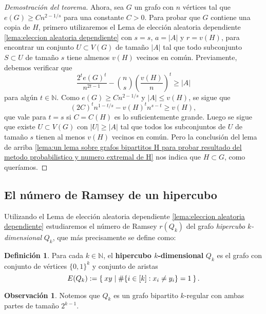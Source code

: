 \documentclass[12pt]{report}
\theoremstyle{plain}
\theoremstyle{definition}
\newtheorem{definition}[theorem]{Definición}
\newtheorem{obs}[theorem]{Observación}
\newcommand{\naturals}{\mathbb{N}}
\newcommand{\abs}[1]{\left \vert #1 \right \vert}
\begin{document}
\begin{proof}[Demostración del teorema]
Ahora, sea $G$ un grafo con $n$ vértices tal que $e(G) \geq C n^{2-1/s}$ para una constante $C >0$. Para probar que $G$ contiene una copia de $H$, primero utilizaremos el Lema de elección aleatoria dependiente \ref{lema:eleccion aleatoria dependiente} con $s = s$, $a = \abs A$ y $r = v(H)$, para encontrar un conjunto $U \subset V(G)$ de tamaño $\abs A$ tal que todo subconjunto $S \subset U$ de tamaño $s$ tiene almenos $v(H)$ vecinos en común. Previamente, debemos verificar que
\[
\frac{2^t e(G)^t}{n^{2t -1}} - \binom n s \left ( \frac{v(H)}{n} \right )^t \geq \abs A
\]
para algún $t \in \naturals$. Como $e(G) \geq C n^{2- 1/s}$ y $\abs A \leq v(H)$, se sigue que
\[
    (2C)^t n^{1- t/s} - v(H)^t n^{s-t} \geq v(H),
\]
que vale para $t = s$ si $C = C(H)$ es lo suficientemente grande. Luego se sigue que existe $U \subset V(G)$ con $\abs U \geq \abs A$ tal que todos los subconjuntos de $U$ de tamaño $s$ tienen al menos $v(H)$ vecinos en común. Pero la conclusión del lema de arriba \ref{lema:un lema sobre grafos bipartitos H para probar resultado del metodo probabilistico y numero extremal de H} nos indica que $H \subset G$, como queríamos.
\end{proof}



\subsection{El número de Ramsey de un hipercubo}

Utilizando el Lema de elección aleatoria dependiente \ref{lema:eleccion aleatoria dependiente} estudiaremos el número de Ramsey $r(Q_k)$ del grafo \textit{hipercubo $k$-dimensional} $Q_k$, que más precisamente se define como:
\begin{definition}
Para cada $k \in \naturals$, el \textbf{hipercubo $k$-dimensional} $Q_k$ es el grafo con conjunto de vértices $\{0,1\}^k$ y conjunto de aristas
\[
    E(Q_k) := \Set{xy | \# \{i \in [k] : x_i \neq y_i\} = 1}.
\]
\end{definition}

\begin{obs}
Notemos que $Q_k$ es un grafo bipartito $k$-regular con ambas partes de tamaño $2^{k-1}$.
\end{obs}
\end{document}

